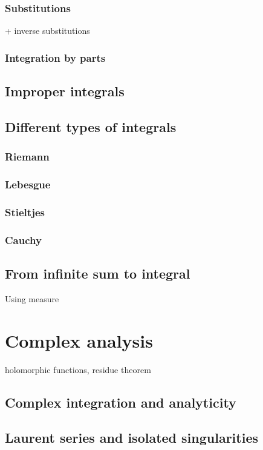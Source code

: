 \subsubsection{Substitutions}
+ inverse substitutions
\subsubsection{Integration by parts}


\subsection{Improper integrals}


\subsection{Different types of integrals}
\subsubsection{Riemann}
\subsubsection{Lebesgue}
\subsubsection{Stieltjes}
\subsubsection{Cauchy}

\subsection{From infinite sum to integral}
Using measure

\section{Complex analysis}
holomorphic functions, residue theorem

\subsection{Complex integration and analyticity}
\subsection{Laurent series and isolated singularities}
